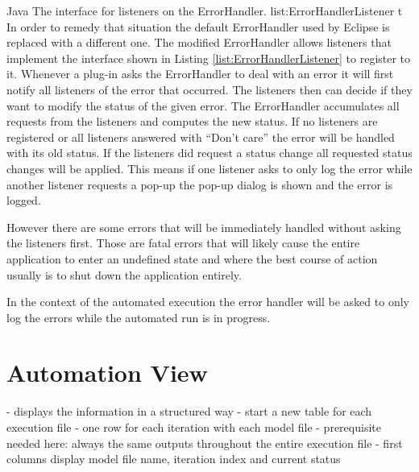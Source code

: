 \listingjava
{}
{Java}
{The interface for listeners on the ErrorHandler.}
{list:ErrorHandlerListener}
{t}
In order to remedy that situation the default ErrorHandler used by Eclipse is replaced with 
a different one. The modified ErrorHandler allows listeners that implement the interface
shown in Listing \ref{list:ErrorHandlerListener} to register to it. Whenever
a plug-in asks the ErrorHandler to deal with an error it will first notify all listeners
of the error that occurred. The listeners then can decide if they want to modify
the status of the given error. The ErrorHandler accumulates all requests from the listeners
and computes the new status. If no listeners are registered or all listeners answered
with ``Don't care'' the error will be handled with its old status. If the listeners
did request a status change all requested status changes will be applied. This
means if one listener asks to only log the error while another listener requests a pop-up
the pop-up dialog is shown and the error is logged.

However there are some errors that will be immediately handled without asking the
listeners first. Those are fatal errors that will likely cause the entire application
to enter an undefined state and where the best course of action usually is to shut down
the application entirely.

In the context of the automated execution the error handler will be asked to only log
the errors while the automated run is in progress.




\section{Automation View}
\label{section:AutoView}
- displays the information in a structured way
- start a new table for each execution file
- one row for each iteration with each model file
 - prerequisite needed here: always the same outputs throughout the entire execution file
- first columns display model file name, iteration index and current status

